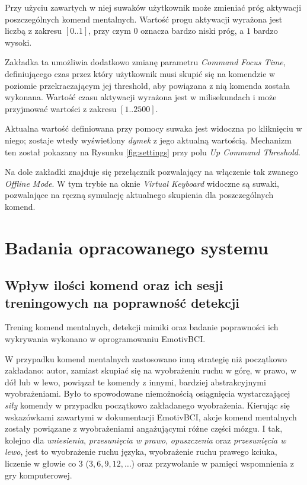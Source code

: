 \documentclass[skorowidz,skroty]{dyplomWEZUT}
\begin{document}
Przy użyciu zawartych w niej suwaków użytkownik może zmieniać próg aktywacji poszczególnych komend mentalnych. Wartość progu aktywacji wyrażona jest liczbą z zakresu $[0..1]$, przy czym $0$ oznacza bardzo niski próg, a $1$ bardzo wysoki.

Zakładka ta umożliwia dodatkowo zmianę parametru \textit{Command Focus Time}, definiującego czas przez który użytkownik musi skupić się na komendzie w poziomie przekraczającym jej threshold, aby powiązana z nią komenda została wykonana. Wartość czasu aktywacji wyrażona jest w milisekundach i może przyjmować wartości z zakresu $[1..2500]$.

Aktualna wartość definiowana przy pomocy suwaka jest widoczna po kliknięciu w niego; zostaje wtedy wyświetlony \textit{dymek} z jego aktualną wartością. Mechanizm ten został pokazany na Rysunku \vref{fig:settings} przy polu \textit{Up Command Threshold}.

Na dole zakładki znajduje się przełącznik pozwalający na włączenie tak zwanego \textit{Offline Mode}. W tym trybie na oknie \textit{Virtual Keyboard} widoczne są suwaki, pozwalające na ręczną symulację aktualnego skupienia dla poszczególnych komend.

\chapter{Badania opracowanego systemu}

\section{Wpływ ilości komend oraz ich sesji treningowych na poprawność detekcji}
Trening komend mentalnych, detekcji mimiki oraz badanie poprawności ich wykrywania wykonano w oprogramowaniu EmotivBCI.

W przypadku komend mentalnych zastosowano inną strategię niż początkowo zakładano: autor, zamiast skupiać się na wyobrażeniu ruchu w górę, w prawo, w dół lub w lewo, powiązał te komendy z innymi, bardziej abstrakcyjnymi wyobrażeniami. Było to spowodowane niemożnością osiągnięcia wystarczającej \textit{siły} komendy w przypadku początkowo zakładanego wyobrażenia. Kierując się wskazówkami zawartymi w dokumentacji EmotivBCI, akcje komend mentalnych zostały powiązane z wyobrażeniami angażującymi różne części mózgu. I tak, kolejno dla \textit{uniesienia}, \textit{przesunięcia w prawo}, \textit{opuszczenia} oraz \textit{przesunięcia w lewo}, jest to wyobrażenie ruchu języka, wyobrażenie ruchu prawego kciuka, liczenie w głowie co $3$ ($3, 6, 9, 12, \dots$) oraz przywołanie w pamięci wspomnienia z gry komputerowej. 
\end{document}

